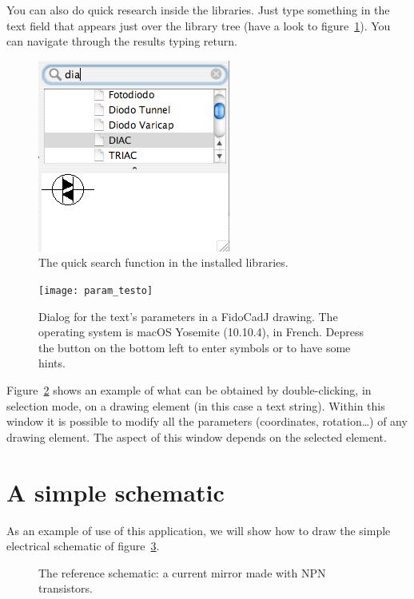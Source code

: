 \documentclass[10pt,a4paper,twoside]{scrreprt}
\begin{document}
You can also do quick research inside the libraries. Just  type something in the text field that appears just over the library tree (have a look to figure~\ref{fig_ricerca}).  You can navigate through the results typing return.

\begin{figure}
\centering
\includegraphics[width=.4\textwidth]{ricerca}
\caption{The quick search function in the installed libraries.}
\label{fig_ricerca}
\end{figure}
%
\begin{figure}
\centering \texttt{[image: param\_testo]}
\caption{Dialog for the text's parameters in a FidoCadJ drawing. The operating system is macOS Yosemite (10.10.4), in French. Depress the button on the bottom left to enter symbols or to have some hints.}
\label{fig_param_testo}
\end{figure}

Figure~\ref{fig_param_testo} shows an example of what can be obtained
by double-clicking, in selection mode, on a drawing
element (in this case a text string). Within this window it is possible
to modify all the parameters (coordinates, rotation\dots) of any
drawing element. The aspect of this window depends on the selected element.

\section{A simple schematic}

As an example of use of this application, we will show how to draw
the simple electrical schematic of figure~\ref{fig_schema}. %
\begin{figure}
\centering %

\caption{The reference schematic: a current mirror made with NPN transistors.}
\label{fig_schema}
\end{figure}
\end{document}
